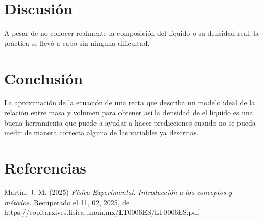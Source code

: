 \documentclass[12pt,a4paper]{article}
\begin{document}
\section{Discusión}

A pesar de no conocer realmente la composición del líquido o su densidad real, la práctica se llevó a cabo sin ninguna dificultad. 

\section{Conclusión}

La aproximación de la ecuación de una recta que describa un modelo ideal de la relación entre masa y volumen para obtener así la densidad de el liquido es una buena herramienta que puede a ayudar a hacer predicciones cuando no se pueda medir de manera correcta alguna de las variables ya descritas.  

\section{Referencias}

Martín, J. M. (2025) \textit{Física Experimental. Introducción a los conceptos y métodos.} Recuperado el 11, 02, 2025, de https://copitarxives.fisica.unam.mx/LT0006ES/LT0006ES.pdf 
\end{document}
